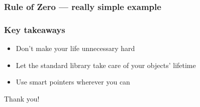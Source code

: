 \documentclass[aspectratio=169]{beamer}
\begin{document}
\begin{frame}
\frametitle{Rule of Zero --- really simple example}
  {\fontsize{4}{4} }
\end{frame}


\begin{frame}
\frametitle{Key takeaways}
{\centering
\begin{itemize}
  \item Don't make your life unnecessary hard
  \item Let the standard library take care of your objects' lifetime
  \item Use smart pointers wherever you can
\end{itemize}

\vspace{2ex}
\begin{center}{\Large Thank you!}\end{center}
}
\end{frame}
\end{document}
